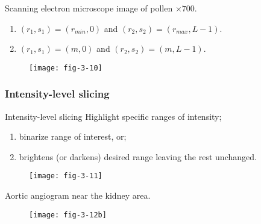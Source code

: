 
\begin{frame}
Scanning electron microscope image of pollen $\times 700$.
\begin{enumerate}
\item $(r_{1},s_{1}) = (r_{min},0)$ and $(r_{2}, s_{2}) = (r_{max}, L-1)$.
\item $(r_{1},s_{1}) = (m,0)$ and $(r_{2}, s_{2}) = (m, L-1)$.
\end{enumerate}
\begin{figure}
\centering
\texttt{[image: fig-3-10]}
\end{figure}\end{frame}


\subsubsection{Intensity-level slicing}


\begin{frame}{Intensity-level slicing}
Highlight specific ranges of intensity;
\begin{enumerate}
\item binarize range of interest, or;
\item brightens (or darkens) desired range leaving the rest unchanged.
\end{enumerate}
\begin{figure}
\centering
\texttt{[image: fig-3-11]}
\end{figure}
\end{frame}


\begin{frame}
Aortic angiogram near the kidney area.
\begin{figure}
\centering
\texttt{[image: fig-3-12b]}
\end{figure}
\end{frame}


